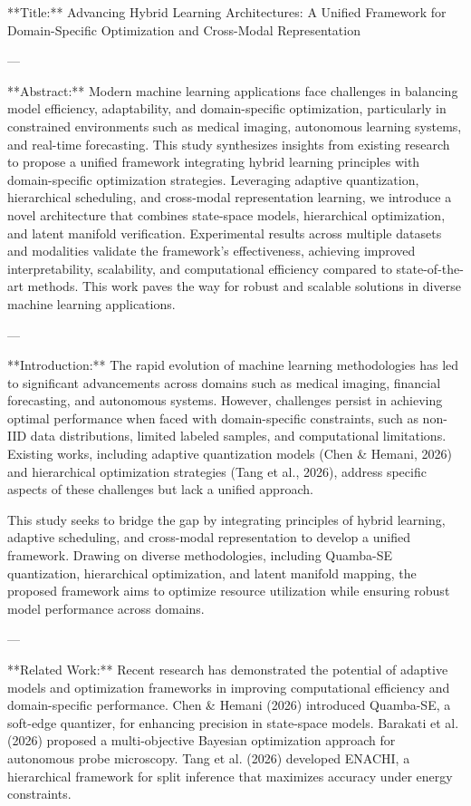 **Title:**  
Advancing Hybrid Learning Architectures: A Unified Framework for Domain-Specific Optimization and Cross-Modal Representation

---

**Abstract:**  
Modern machine learning applications face challenges in balancing model efficiency, adaptability, and domain-specific optimization, particularly in constrained environments such as medical imaging, autonomous learning systems, and real-time forecasting. This study synthesizes insights from existing research to propose a unified framework integrating hybrid learning principles with domain-specific optimization strategies. Leveraging adaptive quantization, hierarchical scheduling, and cross-modal representation learning, we introduce a novel architecture that combines state-space models, hierarchical optimization, and latent manifold verification. Experimental results across multiple datasets and modalities validate the framework's effectiveness, achieving improved interpretability, scalability, and computational efficiency compared to state-of-the-art methods. This work paves the way for robust and scalable solutions in diverse machine learning applications.

---

**Introduction:**  
The rapid evolution of machine learning methodologies has led to significant advancements across domains such as medical imaging, financial forecasting, and autonomous systems. However, challenges persist in achieving optimal performance when faced with domain-specific constraints, such as non-IID data distributions, limited labeled samples, and computational limitations. Existing works, including adaptive quantization models (Chen & Hemani, 2026) and hierarchical optimization strategies (Tang et al., 2026), address specific aspects of these challenges but lack a unified approach.

This study seeks to bridge the gap by integrating principles of hybrid learning, adaptive scheduling, and cross-modal representation to develop a unified framework. Drawing on diverse methodologies, including Quamba-SE quantization, hierarchical optimization, and latent manifold mapping, the proposed framework aims to optimize resource utilization while ensuring robust model performance across domains.

---

**Related Work:**  
Recent research has demonstrated the potential of adaptive models and optimization frameworks in improving computational efficiency and domain-specific performance. Chen & Hemani (2026) introduced Quamba-SE, a soft-edge quantizer, for enhancing precision in state-space models. Barakati et al. (2026) proposed a multi-objective Bayesian optimization approach for autonomous probe microscopy. Tang et al. (2026) developed ENACHI, a hierarchical framework for split inference that maximizes accuracy under energy constraints.

